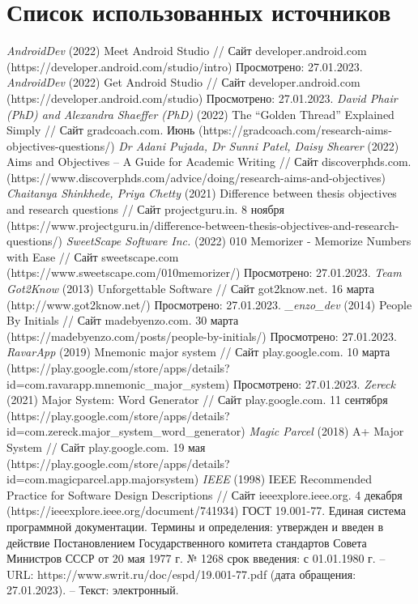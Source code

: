 \documentclass[draft]{article}
\begin{document}
\section*{Список использованных источников}
\begin{thebibliography}{}
 \textit{AndroidDev} (2022) Meet Android Studio // Сайт developer.android.com (https://developer.android.com/studio/intro) Просмотрено: 27.01.2023.
 \textit{AndroidDev} (2022) Get Android Studio // Сайт developer.android.com (https://developer.android.com/studio) Просмотрено: 27.01.2023.
 \textit{David Phair (PhD) and Alexandra Shaeffer (PhD)} (2022) The “Golden Thread” Explained Simply // Сайт gradcoach.com. Июнь (https://gradcoach.com/research-aims-objectives-questions/)
 \textit{Dr Adani Pujada, Dr Sunni Patel, Daisy Shearer} (2022) Aims and Objectives – A Guide for Academic Writing // Сайт discoverphds.com. (https://www.discoverphds.com/advice/doing/research-aims-and-objectives)
 \textit{Chaitanya Shinkhede, Priya Chetty} (2021) Difference between thesis objectives and research questions // Сайт projectguru.in. 8 ноября (https://www.projectguru.in/difference-between-thesis-objectives-and-research-questions/)
 \textit{SweetScape Software Inc.} (2022) 010 Memorizer - Memorize Numbers with Ease // Сайт sweetscape.com (https://www.sweetscape.com/010memorizer/) Просмотрено: 27.01.2023.
 \textit{Team Got2Know} (2013) Unforgettable Software // Сайт got2know.net. 16 марта (http://www.got2know.net/) Просмотрено: 27.01.2023.
 \textit{\_enzo\_dev} (2014) People By Initials // Сайт madebyenzo.com. 30 марта (https://madebyenzo.com/posts/people-by-initials/) Просмотрено: 27.01.2023.
 \textit{RavarApp} (2019) Mnemonic major system // Сайт play.google.com. 10 марта (https://play.google.com/store/apps/details?id=com.ravarapp.mnemonic\_major\_system) Просмотрено: 27.01.2023.			
 \textit{Zereck} (2021) Major System: Word Generator // Сайт play.google.com. 11 сентября (https://play.google.com/store/apps/details?id=com.zereck.major\_system\_word\_generator)
 \textit{Magic Parcel} (2018) A+ Major System // Сайт play.google.com. 19 мая (https://play.google.com/store/apps/details?id=com.magicparcel.app.majorsystem)
 \textit{IEEE} (1998) IEEE Recommended Practice for Software Design Descriptions // Сайт ieeexplore.ieee.org. 4 декабря (https://ieeexplore.ieee.org/document/741934)
 ГОСТ 19.001-77. Единая система программной документации. Термины и определения: утвержден и введен в действие Постановлением Государственного комитета стандартов Совета Министров СССР от 20 мая 1977 г. № 1268 срок введения: с 01.01.1980 г. – URL: https://www.swrit.ru/doc/espd/19.001-77.pdf (дата обращения: 27.01.2023). – Текст: электронный.
\end{thebibliography}
\end{document}
